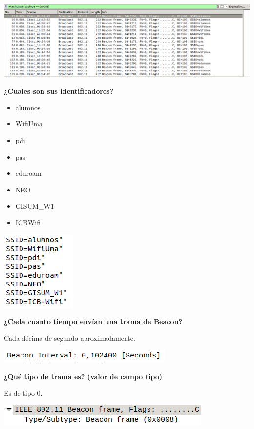 \documentclass{article}
\begin{document}
\begin{center}
\includegraphics[scale=0.3]{WLAN/beacon.png}
\end{center}

\textbf{¿Cuales son sus identificadores?}

\begin{itemize}
\item alumnos
\item WifiUma
\item pdi
\item pas
\item eduroam
\item NEO
\item GISUM\_W1
\item ICB\-Wifi
\end{itemize}

\begin{center}
\includegraphics[scale=0.4]{WLAN/SSIDssss.png}
\end{center}

\textbf{¿Cada cuanto tiempo envían una trama de Beacon?}

Cada décima de segundo aproximadamente.

\begin{center}
\includegraphics[scale=0.4]{WLAN/interval.png}
\end{center}


\textbf{¿Qué tipo de trama es? (valor de campo tipo)}

Es de tipo 0.

\begin{center}
\includegraphics[scale=0.4]{WLAN/subtype.png}
\end{center}
\end{document}
